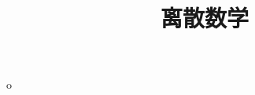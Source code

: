 \documentclass{book}
\begin{document}
\begin{CJK*}{UTF8}{gbsn}
  \title{离散数学}
  \maketitle

  \newtheorem{Ex}{习题}[chapter]


  
  
  \setcounter{chapter}{0}o
  
  
  
\end{CJK*}
\end{document}
